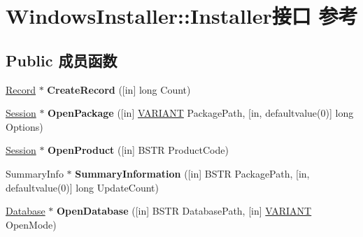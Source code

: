 \hypertarget{interface_windows_installer_1_1_installer}{}\section{Windows\+Installer\+:\+:Installer接口 参考}
\label{interface_windows_installer_1_1_installer}
\subsection*{Public 成员函数}
\begin{DoxyCompactItemize}
\item 
\mbox{\label{interface_windows_installer_1_1_installer_a49cb288da44b13177961f86ba15c9bf4}} 
\hyperlink{interface_windows_installer_1_1_record}{Record} $\ast$ {\bfseries Create\+Record} (\mbox{[}in\mbox{]} long Count)
\item 
\mbox{\label{interface_windows_installer_1_1_installer_a57a58be66e62749424c938f57a6f06af}} 
\hyperlink{interface_windows_installer_1_1_session}{Session} $\ast$ {\bfseries Open\+Package} (\mbox{[}in\mbox{]} \hyperlink{structtag_v_a_r_i_a_n_t}{V\+A\+R\+I\+A\+NT} Package\+Path, \mbox{[}in, defaultvalue(0)\mbox{]} long Options)
\item 
\mbox{\label{interface_windows_installer_1_1_installer_aad2060abf7846263d962a9c19790a9b4}} 
\hyperlink{interface_windows_installer_1_1_session}{Session} $\ast$ {\bfseries Open\+Product} (\mbox{[}in\mbox{]} B\+S\+TR Product\+Code)
\item 
\mbox{\label{interface_windows_installer_1_1_installer_af3c905638b5bad6a3415e94f40af20e2}} 
Summary\+Info $\ast$ {\bfseries Summary\+Information} (\mbox{[}in\mbox{]} B\+S\+TR Package\+Path, \mbox{[}in, defaultvalue(0)\mbox{]} long Update\+Count)
\item 
\mbox{\label{interface_windows_installer_1_1_installer_a7f4958dc39868e4d867fd0bf5333d6d1}} 
\hyperlink{struct_database}{Database} $\ast$ {\bfseries Open\+Database} (\mbox{[}in\mbox{]} B\+S\+TR Database\+Path, \mbox{[}in\mbox{]} \hyperlink{structtag_v_a_r_i_a_n_t}{V\+A\+R\+I\+A\+NT} Open\+Mode)

\end{DoxyCompactItemize}
